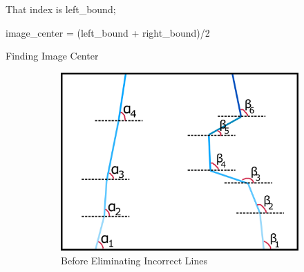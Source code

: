 \documentclass[a4paper,12pt]{article}
\begin{document}
\begin{enumerate}[A.]
\begin{algorithm}
{			That index is left\_bound;

		}
		

	image\_center = (left\_bound + right\_bound)/2
	

	\caption{Finding Image Center\label{algo:center_image}}
\end{algorithm}

\begin{figure}[t!]

\setlength{\unitlength}{\textwidth} 

\centering

\begin{subfigure}{.46\textwidth}

\centering

\includegraphics[width=0.44\unitlength]{images/dataP_explained1}

\caption{\label{fig:dataP_explained1} Before Eliminating Incorrect Lines}

\end{subfigure}%
\begin{subfigure}{.46\textwidth}

\centering


\end{subfigure}
\end{figure}
\end{enumerate}
\end{document}
